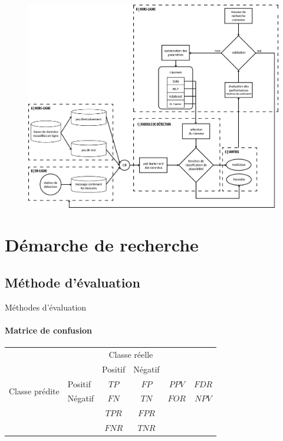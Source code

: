 \documentclass{beamer}
\begin{document}
\begin{frame}
\begin{figure}
\centering
\includegraphics[width=.9\textwidth]{img/structure.png}
\end{figure}
\end{frame}

\section{Démarche de recherche}

\subsection{Méthode d'évaluation}

\begin{frame}{Méthodes d'évaluation}
\framesubtitle{Matrice de confusion}

\begin{tabular}{ l | l | c | c | c c}
\multicolumn{2}{c}{} & \multicolumn{2}{c}{Classe réelle} & \\
\cline{3-4}
\multicolumn{2}{c|}{} & Positif & Négatif \\
\cline{2-4}
\multirow{2}{*}{Classe prédite} & Positif & $TP$ & $FP$ & $PPV$ & $FDR$ \\
\cline{2-4}
& Négatif & $FN$ & $TN$ & $FOR$ & $NPV$ \\
\cline{2-4}
\multicolumn{1}{r}{} & \multicolumn{1}{l}{} & \multicolumn{1}{c}{$TPR$} & \multicolumn{1}{c}{$FPR$} \\
\multicolumn{1}{l}{} & \multicolumn{1}{l}{} & \multicolumn{1}{c}{$FNR$} & \multicolumn{1}{c}{$TNR$} \\
\end{tabular}

\end{frame}
\end{document}
